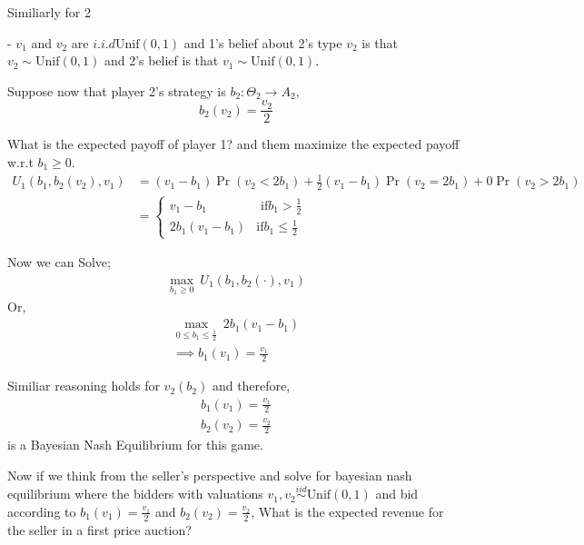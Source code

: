 \documentclass[12pt,a4paper]{article}
\begin{document}
Similiarly for 2 

- \(v_{1}\) and \(v_{2}\) are \(i.i.d \text{Unif}(0,1)\) and 1's belief about 2's type \(v_{2}\) is that \(v_{2} \sim \text{Unif}(0,1)\) and 2's belief is that \(v_{1} \sim \text{Unif}(0,1)\).

Suppose now that player 2's strategy is \(b_{2}: \Theta_{2} \to A_{2}\), 
\begin{equation*}
    b_{2}(v_{2})=\frac{v_{2}}{2}
\end{equation*} 

What is the expected payoff of player 1? and them maximize the expected payoff w.r.t \(b_{1} \geq 0\).
\begin{align*}
    U_{1}(b_{1},b_{2}(v_{2}),v_{1})&= \left( v_{1}-b_{1} \right)\Pr(v_{2}<2b_{1}) + \frac{1}{2}(v_{1}-b_{1})\Pr(v_{2}=2b_{1}) + 0\Pr(v_{2}>2b_{1})\\
    &=\begin{cases}
        v_{1}-b_{1} & \text{ if} b_{1}>\frac{1}{2}\\
        2b_{1}\left( v_{1}-b_{1} \right) & \text{if} b_{1} \leq \frac{1}{2} 
    \end{cases}
\end{align*}  

Now we can Solve;  
\begin{align*}
    \max_{b_{1} \geq 0} \ U_{1}(b_{1},b_{2}(\cdot),v_{1})
\end{align*}
Or,
\begin{align*}
    \max_{0 \leq b_{1} \leq \frac{1}{2}} \ 2b_{1}(v_{1}-b_{1})\\
    \implies b_{1}(v_{1})= \frac{v_{1}}{2}
\end{align*}

Similiar reasoning holds for \(v_{2}(b_{2})\)  and therefore,
\begin{equation*}
    \begin{split}
        b_{1}(v_{1})=\frac{v_{1}}{2}\\
        b_{2}(v_{2})=\frac{v_{2}}{2}
    \end{split}
\end{equation*}     
is a Bayesian Nash Equilibrium for this game.

Now if we think from the seller's perspective and solve for bayesian nash equilibrium where the bidders with valuations \(v_{1},v_{2} \overset{iid}{\sim}\text{Unif}(0,1)\)   and bid according to \(b_{1}(v_{1})=\frac{v_{1}}{2}\) and \(b_{2}(v_{2})=\frac{v_{2}}{2}\), What is the expected revenue for the seller in a first price auction? 
\end{document}
